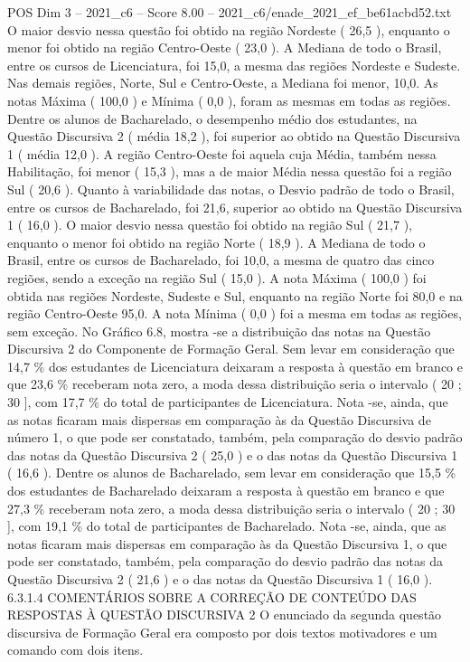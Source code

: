 \begin{textsample}{POS Dim 3 – 2021\_c6 – Score 8.00 – 2021\_c6/enade\_2021\_ef\_be61acbd52.txt}
O maior desvio nessa questão foi obtido na região Nordeste ( 26,5 ), enquanto o menor foi obtido na região Centro-Oeste ( 23,0 ).
A Mediana de todo o Brasil, entre os cursos de Licenciatura, foi 15,0, a mesma das regiões Nordeste e Sudeste.
Nas demais regiões, Norte, Sul e Centro-Oeste, a Mediana foi menor, 10,0.
As notas Máxima ( 100,0 ) e Mínima ( 0,0 ), foram as mesmas em todas as regiões.
Dentre os alunos de Bacharelado, o desempenho médio dos estudantes, na Questão Discursiva 2 ( média 18,2 ), foi superior ao obtido na Questão Discursiva 1 ( média 12,0 ).
A região Centro-Oeste foi aquela cuja Média, também nessa Habilitação, foi menor ( 15,3 ), mas a de maior Média nessa questão foi a região Sul ( 20,6 ).
Quanto à variabilidade das notas, o Desvio padrão de todo o Brasil, entre os cursos de Bacharelado, foi 21,6, superior ao obtido na Questão Discursiva 1 ( 16,0 ).
O maior desvio nessa questão foi obtido na região Sul ( 21,7 ), enquanto o menor foi obtido na região Norte ( 18,9 ).
A Mediana de todo o Brasil, entre os cursos de Bacharelado, foi 10,0, a mesma de quatro das cinco regiões, sendo a exceção na região Sul ( 15,0 ).
A nota Máxima ( 100,0 ) foi obtida nas regiões Nordeste, Sudeste e Sul, enquanto na região Norte foi 80,0 e na região Centro-Oeste 95,0.
A nota Mínima ( 0,0 ) foi a mesma em todas as regiões, sem exceção.
No Gráfico 6.8, mostra -se a distribuição das notas na Questão Discursiva 2 do Componente de Formação Geral.
Sem levar em consideração que 14,7 \% dos estudantes de Licenciatura deixaram a resposta à questão em branco e que 23,6 \% receberam nota zero, a moda dessa distribuição seria o intervalo ( 20 ; 30 ], com 17,7 \% do total de participantes de Licenciatura.
Nota -se, ainda, que as notas ficaram mais dispersas em comparação às da Questão Discursiva de número 1, o que pode ser constatado, também, pela comparação do desvio padrão das notas da Questão Discursiva 2 ( 25,0 ) e o das notas da Questão Discursiva 1 ( 16,6 ).
Dentre os alunos de Bacharelado, sem levar em consideração que 15,5 \% dos estudantes de Bacharelado deixaram a resposta à questão em branco e que 27,3 \% receberam nota zero, a moda dessa distribuição seria o intervalo ( 20 ; 30 ], com 19,1 \% do total de participantes de Bacharelado.
Nota -se, ainda, que as notas ficaram mais dispersas em comparação às da Questão Discursiva 1, o que pode ser constatado, também, pela comparação do desvio padrão das notas da Questão Discursiva 2 ( 21,6 ) e o das notas da Questão Discursiva 1 ( 16,0 ). 6.3.1.4 COMENTÁRIOS SOBRE A CORREÇÃO DE CONTEÚDO DAS RESPOSTAS À QUESTÃO DISCURSIVA 2 O enunciado da segunda questão discursiva de Formação Geral era composto por dois textos motivadores e um comando com dois itens.

\end{textsample}
